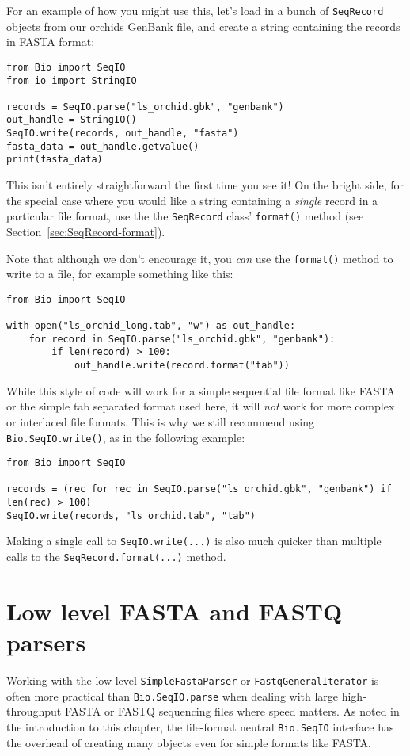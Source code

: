 For an example of how you might use this, let's load in a bunch of \verb|SeqRecord| objects from our orchids GenBank file, and create a string containing the records in FASTA format:

\begin{verbatim}
from Bio import SeqIO
from io import StringIO

records = SeqIO.parse("ls_orchid.gbk", "genbank")
out_handle = StringIO()
SeqIO.write(records, out_handle, "fasta")
fasta_data = out_handle.getvalue()
print(fasta_data)
\end{verbatim}

This isn't entirely straightforward the first time you see it!  On the bright side, for the special case where you would like a string containing a \emph{single} record in a particular file format, use the the \verb|SeqRecord| class' \verb|format()| method (see Section~\ref{sec:SeqRecord-format}).

Note that although we don't encourage it, you \emph{can} use the \verb|format()| method to write to a file, for example something like this:
\begin{verbatim}
from Bio import SeqIO

with open("ls_orchid_long.tab", "w") as out_handle:
    for record in SeqIO.parse("ls_orchid.gbk", "genbank"):
        if len(record) > 100:
            out_handle.write(record.format("tab"))
\end{verbatim}
\noindent While this style of code will work for a simple sequential file format like FASTA or the simple tab separated format used here, it will \emph{not} work for more complex or interlaced file formats.  This is why we still recommend using \verb|Bio.SeqIO.write()|, as in the following example:
\begin{verbatim}
from Bio import SeqIO

records = (rec for rec in SeqIO.parse("ls_orchid.gbk", "genbank") if len(rec) > 100)
SeqIO.write(records, "ls_orchid.tab", "tab")
\end{verbatim}
\noindent Making a single call to \verb|SeqIO.write(...)| is also much quicker than
multiple calls to the \verb|SeqRecord.format(...)| method.

\section{Low level FASTA and FASTQ parsers}
\label{sec:low-level-fasta-fastq}

Working with the low-level \verb|SimpleFastaParser| or
\verb|FastqGeneralIterator| is often more practical than
\verb|Bio.SeqIO.parse| when dealing with large high-throughput FASTA
or FASTQ sequencing files where speed matters.
As noted in the introduction to this chapter, the file-format neutral
\verb|Bio.SeqIO| interface has the overhead of creating many objects
even for simple formats like FASTA.

